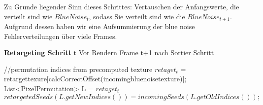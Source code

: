 \cite{hal02158423}

Zu Grunde liegender Sinn dieses Schrittes: Vertauschen der Anfangswerte, die 
verteilt sind wie $BlueNoise_{t}$, sodass Sie verteilt sind wie die 
$BlueNoise_{t+1}$. Aufgrund dessen haben wir eine Aufsummierung der
blue noise Fehlerverteilungen über viele Frames.

\begin{algorithm}[H]
    \caption{\textbf{Retargeting Schritt} t Vor Rendern Frame t+1 nach Sortier Schritt}
    \begin{algorithmic}[1]
        \STATE //permutation indices from precomputed texture
        \STATE $retaget_{t}$ = retargettexure[calcCorrectOffset(incomingbluenoisetexture)];
        \STATE List<PixelPermutation> L = $retaget_{t}$
        \STATE $retargetedSeeds(L.getNewIndices()) = incomingSeeds(L.getOldIndices());$
        \ENDFOR
    \end{algorithmic}
    \label{alg:retargeting}
\end{algorithm}
